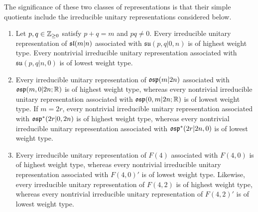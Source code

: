The significance of these two classes of representations is that their simple quotients include the irreducible unitary representations considered below.

\begin{theorem}
\label{theorem::unitary-highest-lowest-weight} \begin{enumerate}
 \item[(a)]  Let $p,q\in\ZZ_{\geq0}$ satisfy $p+q=m$ and $pq\neq 0$. Every irreducible unitary representation of $\sl(m\vert n)$ associated with $\mathfrak{su}(p,q\vert0,n)$ is of highest weight type. Every nontrivial irreducible unitary representation associated with $\mathfrak{su}(p,q\vert n,0)$ is of lowest weight type.
 \item[(b)] 
 Every irreducible unitary representation of
 $\osp(m\vert2n)$ associated with $\osp(m,0 \vert 2n; \RR)$ is of highest
 weight type, whereas every nontrivial irreducible unitary representation
 associated with $\osp(0,m\vert2n;\RR)$ is of lowest weight type. If
 $m=2r$, every nontrivial irreducible unitary representation associated
 with $\osp^{\ast}(2r\vert0,2n)$ is of highest weight type, whereas every
 nontrivial irreducible unitary representation associated with
 $\osp^{\ast}(2r\vert2n,0)$ is of lowest weight type. 
 \item[(c)]
Every irreducible unitary representation of $F(4)$ associated with $F(4,0)$ is
of highest weight type, whereas
every nontrivial irreducible unitary representation associated with $F(4,0)'$ is of
lowest weight type. Likewise, every irreducible unitary
representation of $F(4,2)$ is of highest weight type, whereas every nontrivial irreducible
 unitary representation of $F(4,2)'$ is of lowest weight type.
\end{enumerate}
\end{theorem}

